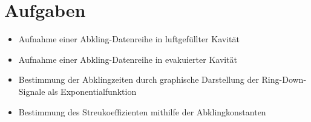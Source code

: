 \section{Aufgaben}

\begin{itemize}
\item Aufnahme einer Abkling-Datenreihe in luftgefüllter Kavität
\item Aufnahme einer Abkling-Datenreihe in evakuierter Kavität
\item Bestimmung der Abklingzeiten durch graphische Darstellung der Ring-Down-Signale als Exponentialfunktion
\item Bestimmung des Streukoeffizienten mithilfe der Abklingkonstanten
\end{itemize}
